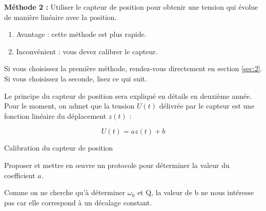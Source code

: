 \documentclass[a4paper,french,bookmarks]{article}
\begin{document}
\textbf{Méthode 2 :} Utiliser le capteur de position pour obtenir une tension qui évolue de manière linéaire avec la position.
\begin{enumerate}
    \item[\faThumbsOUp]  Avantage : cette méthode est plus rapide.
    \item[\faThumbsODown]  Inconvénient : vous devez calibrer le capteur.
\end{enumerate}

\begin{center}
    \begin{minipage}{0.6\linewidth}
    \begin{tcolorbox}[
        breakable,
        enhanced,
        interior style      = {color=colexp!10},
        borderline north    = {.5pt}{0pt}{colexp!10},
        borderline south    = {.5pt}{0pt}{colexp!10},
        borderline west     = {.5pt}{0pt}{colexp!10},
        borderline east     = {.5pt}{0pt}{colexp!10},
        sharp corners       = downhill,
        arc                 = 0 cm,
        boxrule             = 0.5pt,
        drop fuzzy shadow   = black!50!white
    ]
        Si vous choisissez la première méthode, rendez-vous directement en section \ref{sec:2}. Si vous choisissez la seconde, lisez ce qui suit.
    \end{tcolorbox}
\end{minipage}
\end{center}

Le principe du capteur de position sera expliqué en détails en deuxième année. Pour le moment, on admet que la tension $U(t)$ délivrée par le capteur est une fonction linéaire du déplacement $z(t)$ :

\begin{equation}
    U(t) = a z(t) + b
\end{equation}

\setcounter{cours}{-1}
\begin{experience}{Calibration du capteur de position}{}
    \begin{enumerate}
        \ithand Proposer et mettre en œuvre un protocole pour déterminer la valeur du coefficient $a$.
    \end{enumerate}
\end{experience}

Comme on ne cherche qu’à déterminer $\omega_0$ et Q, la valeur de b ne nous intéresse pas car elle correspond à un décalage
constant.

\end{document}
